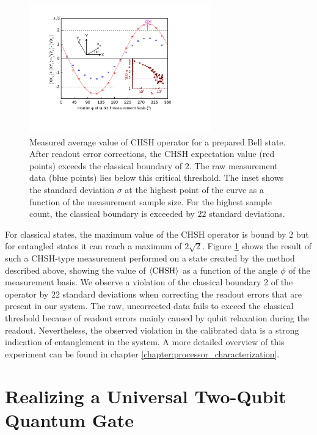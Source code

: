 %
\begin{figure}[ht!]
 \centering \includegraphics[width=0.7\textwidth]{./material/papers/iswap/submission1/Dewes_Figure3}
\caption[Measurement of the CHSH operator of an entangled two-qubit state]{Measured average value of CHSH operator for a prepared
Bell state. After readout error corrections, the CHSH expectation
value (red points) exceeds the classical boundary of $2$. The raw
measurement data (blue points) lies below this critical threshold.
The inset shows the standard deviation $\sigma$ at the highest point
of the curve as a function of the measurement sample size. For the
highest sample count, the classical boundary is exceeded by $22$
standard deviations.}


\label{fig:chsh_measurement} %
\end{figure}


For classical states, the maximum value of the $\mathrm{CHSH}$ operator
is bound by $2$ but for entangled states it can reach a maximum of
$2\sqrt{2}$. Figure \ref{fig:chsh_measurement}
shows the result of such a $\mathrm{CHSH}$-type measurement performed
on a state created by the method described above, showing the value
of $\left< \mathrm{CHSH} \right>$ as a function of the angle $\phi$ of
the measurement basis. We observe a violation of the classical boundary $2$
of the operator by $22$ standard deviations when correcting the readout
errors that are present in our system. The raw, uncorrected data fails
to exceed the classical threshold because of readout errors mainly
caused by qubit relaxation during the readout. Nevertheless, the observed
violation in the calibrated data is a strong indication
of entanglement in the system. A more detailed overview of this experiment can be found in chapter \ref{chapter:processor_characterization}.


\section{Realizing a Universal Two-Qubit Quantum Gate}

